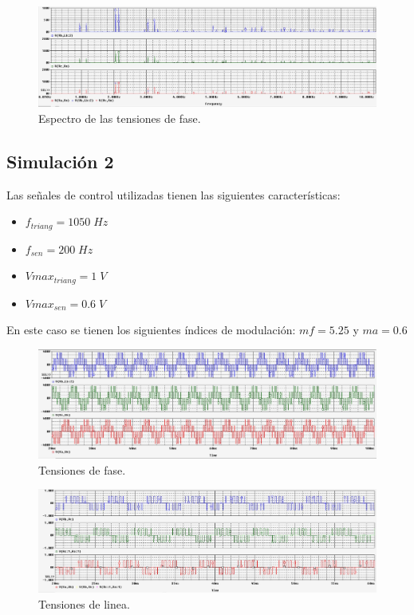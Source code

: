 \documentclass[11pt, a4paper]{article}
\begin{document}
\begin{figure}[h!]
\centering
\includegraphics[width=15cm]{primer/Espectro_Fase1}
\caption{Espectro de las tensiones de fase.}
\label{fig:esp21}
\end{figure}

\newpage

\subsection{Simulación 2}
Las señales de control utilizadas tienen las siguientes características: 
\begin{itemize}
\item $f_{triang} = 1050 \; Hz$
\item $f_{sen} = 200 \; Hz$
\item $Vmax_{triang} = 1 \;V$
\item $Vmax_{sen} = 0.6 \; V$
\end{itemize}
En este caso se tienen los siguientes índices de modulación: $mf = 5.25$ y $ma = 0.6$


\begin{figure}[h!]
\centering
\includegraphics[width=15cm]{Segundo/Vfase}
\caption{Tensiones de fase.}
\label{fig:Vfase525}
\end{figure}

\begin{figure}[h!]
\centering
\includegraphics[width=15cm]{Segundo/vlinea}
\caption{Tensiones de linea.}
\label{fig:Vlinea525}
\end{figure}
\end{document}
